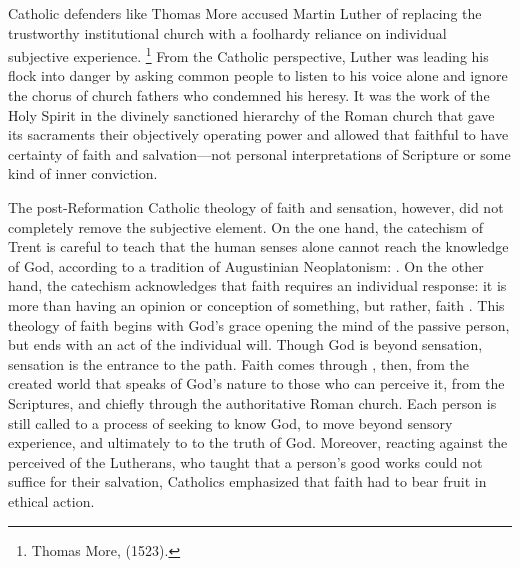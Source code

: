 Catholic defenders like Thomas More accused Martin Luther of replacing the
trustworthy institutional church with a foolhardy reliance on individual
subjective experience.%
    \footnote{Thomas More,  (1523).}
From the Catholic perspective, Luther was leading his flock into danger by
asking common people to listen to his voice alone and ignore the chorus of
church fathers who condemned his heresy.
It was the work of the Holy Spirit in the divinely sanctioned hierarchy of the
Roman church that gave its sacraments their objectively operating power and
allowed that faithful to have certainty of faith and salvation---not personal
interpretations of Scripture or some kind of inner conviction.%
    \Autocite[131--208]{Schreiner:Certainty}

The post-Reformation Catholic theology of faith and sensation, however, did not
completely remove the subjective element.
On the one hand, the catechism of Trent is careful to teach that the human
senses alone cannot reach the knowledge of God, according to a tradition of
Augustinian Neoplatonism:
.%
    \Autocite[18]{Catholic:Catechismus1614}
On the other hand, the catechism acknowledges that faith requires an individual
response: it is more than having an opinion or conception of something, but
rather, faith .%
    \Autocite[15]{Catholic:Catechismus1614}
This theology of faith begins with God's grace opening the mind of the
passive person, but ends with an act of the individual will.
Though God is beyond sensation, sensation is the entrance to the path. 
Faith comes through , then, from the created world that
speaks of God's nature to those who can perceive it, from the Scriptures, and
chiefly through the authoritative Roman church.
Each person is still called to a process of seeking to know God, to move beyond
sensory experience, and ultimately to  to the truth of God.
Moreover, reacting against the perceived  of the Lutherans, who
taught that a person's good works could not suffice for their salvation,
Catholics emphasized that faith had to bear fruit in ethical action.

